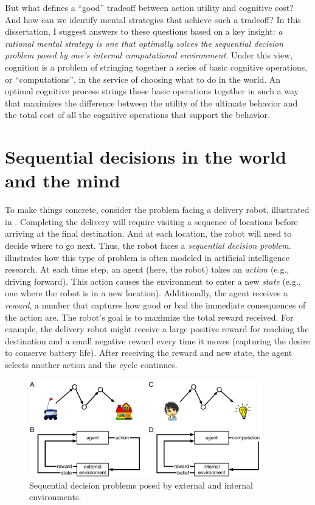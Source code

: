 But what defines a ``good'' tradeoff between action utility and cognitive cost? And how can we identify mental strategies that achieve such a tradeoff? In this dissertation, I suggest answers to these questions based on a key insight: \emph{a rational mental strategy is one that optimally solves the sequential decision problem posed by one's internal computational environment}. Under this view, cognition is a problem of stringing together a series of basic cognitive operations, or ``computations'', in the service of choosing what to do in the world. An optimal cognitive process strings those basic operations together in such a way that maximizes the difference between the utility of the ultimate behavior and the total cost of all the cognitive operations that support the behavior.


\section{Sequential decisions in the world and the mind}\label{sec:intro-intuition}

To make things concrete, consider the problem facing a delivery robot, illustrated in . Completing the delivery will require visiting a sequence of locations before arriving at the final destination. And at each location, the robot will need to decide where to go next. Thus, the robot faces a \emph{sequential decision problem}.  illustrates how this type of problem is often modeled in artificial intelligence research. At each time step, an agent (here, the robot) takes an \emph{action} (e.g., driving forward). This action causes the environment to enter a new \emph{state} (e.g., one where the robot is in a new location). Additionally, the agent receives a \emph{reward}, a number that captures how good or bad the immediate consequences of the action are. The robot's goal is to maximize the total reward received. For example, the delivery robot might receive a large positive reward for reaching the destination and a small negative reward every time it moves (capturing the desire to conserve battery life). After receiving the reward and new state, the agent selects another action and the cycle continues.

\begin{figure}[tb]
  \centering
  \includegraphics[width=0.9\textwidth]{diagrams/sequential-intuition.pdf}
  \caption{Sequential decision problems posed by external and internal environments.}
  \label{fig:sequential-intuition}
\end{figure}

